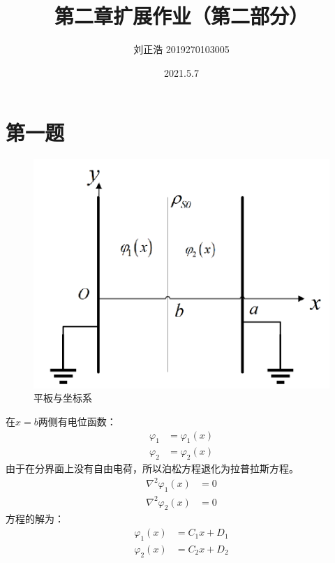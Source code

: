\documentclass[a4paper]{article}
\title{\heiti\zihao{2} 第二章扩展作业（第二部分）}
\author{\songti 刘正浩 2019270103005}
\date{2021.5.7}
\begin{document}
	\maketitle
	\thispagestyle{empty}


	\tableofcontents

	\section{第一题}
		\begin{figure}[htbp]
			\centering
			\includegraphics[scale=0.8]{1.png}
			\caption{平板与坐标系}
		\end{figure}
		在$x=b$两侧有电位函数：
		\begin{equation}
			\begin{split}
				\varphi_1 &= \varphi_1(x)\\
				\varphi_2 &= \varphi_2(x)
			\end{split}
		\end{equation}
		由于在分界面上没有自由电荷，所以泊松方程退化为拉普拉斯方程。
		\begin{equation}
			\begin{split}
				\nabla^2 \varphi_1(x) &= 0\\
				\nabla^2 \varphi_2(x) &= 0
			\end{split}
		\end{equation}
		方程的解为：
		\begin{equation}
			\begin{split}
				\varphi_1(x) &= C_1 x + D_1\\
				\varphi_2(x) &= C_2 x + D_2
			\end{split}
		\end{equation}
\end{document}
